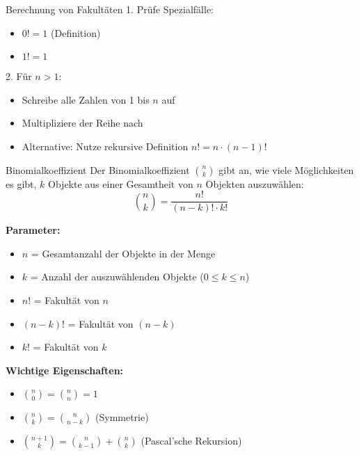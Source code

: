 \begin{KR}{Berechnung von Fakultäten}
1. Prüfe Spezialfälle:
   \begin{itemize}
   \item $0! = 1$ (Definition)
   \item $1! = 1$
   \end{itemize}
2. Für $n > 1$:
   \begin{itemize}
   \item Schreibe alle Zahlen von 1 bis $n$ auf
   \item Multipliziere der Reihe nach
   \item Alternative: Nutze rekursive Definition $n! = n \cdot (n-1)!$
   \end{itemize}
\end{KR}

\begin{definition}{Binomialkoeffizient}
Der Binomialkoeffizient $\binom{n}{k}$ gibt an, wie viele Möglichkeiten es gibt, $k$ Objekte aus einer Gesamtheit von $n$ Objekten auszuwählen:
$$
\binom{n}{k}=\frac{n!}{(n-k)!\cdot k!}
$$

\textbf{Parameter:}
\begin{itemize}
    \item $n$ = Gesamtanzahl der Objekte in der Menge
    \item $k$ = Anzahl der auszuwählenden Objekte ($0 \leq k \leq n$)
    \item $n!$ = Fakultät von $n$
    \item $(n-k)!$ = Fakultät von $(n-k)$
    \item $k!$ = Fakultät von $k$
\end{itemize}

\textbf{Wichtige Eigenschaften:}
\begin{itemize}
    \item $\binom{n}{0} = \binom{n}{n} = 1$
    \item $\binom{n}{k} = \binom{n}{n-k}$ (Symmetrie)
    \item $\binom{n+1}{k} = \binom{n}{k-1} + \binom{n}{k}$ (Pascal'sche Rekursion)
\end{itemize}
\end{definition}

